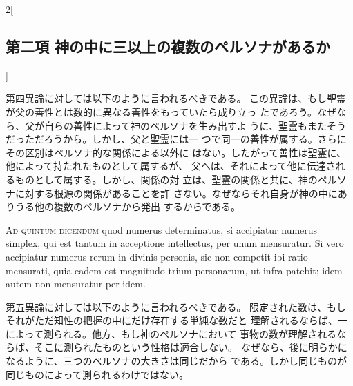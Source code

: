 \documentclass[paper=a4paper,fontsize=10pt,jafontsize=9pt,titlepage]{jlreq}
\begin{document}
\begin{paracol}{2}[\subsection{第二項 神の中に三以上の複数のペルソナがあるか}]
\switchcolumn


第四異論に対しては以下のように言われるべきである。
この異論は、もし聖霊が父の善性とは数的に異なる善性をもっていたら成り立っ
 たであろう。なぜなら、父が自らの善性によって神のペルソナを生み出すよ
 うに、聖霊もまたそうだっただろうから。しかし、父と聖霊には一
 つで同一の善性が属する。さらにその区別はペルソナ的な関係による以外に
 はない。したがって善性は聖霊に、他によって持たれたものとして属するが、
 父へは、それによって他に伝達されるものとして属する。しかし、関係の対
 立は、聖霊の関係と共に、神のペルソナに対する根源の関係があることを許
 さない。なぜならそれ自身が神の中にありうる他の複数のペルソナから発出
 するからである。


\switchcolumn*[\subsection{ad.5}]


{\scshape Ad quintum dicendum} quod numerus determinatus, si accipiatur numerus
simplex, qui est tantum in acceptione intellectus, per unum
mensuratur. Si vero accipiatur numerus rerum in divinis personis, sic
non competit ibi ratio mensurati, quia eadem est magnitudo trium
personarum, ut infra patebit; idem autem non mensuratur per idem.


\switchcolumn


第五異論に対しては以下のように言われるべきである。
限定された数は、もしそれがただ知性の把握の中にだけ存在する単純な数だと
 理解されるならば、一によって測られる。他方、もし神のペルソナにおいて
 事物の数が理解されるならば、そこに測られたものという性格は適合しない。
 なぜなら、後に明らかになるように、三つのペルソナの大きさは同じだから
 である。しかし同じものが同じものによって測られるわけではない。


\switchcolumn*



\end{paracol}
\newpage


\end{document}
